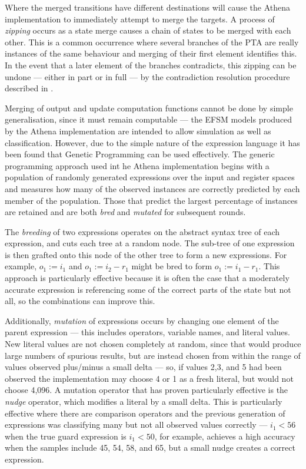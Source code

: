 Where the merged transitions have different destinations will cause the Athena implementation to immediately attempt to merge the targets. A process of \emph{zipping} occurs as a state merge causes a chain of states to be merged with each other. This is a common occurrence where several branches of the PTA are really instances of the same behaviour and merging of their first element identifies this. In the event that a later element of the branches contradicts, this zipping can be undone --- either in part or in full --- by the contradiction resolution procedure described in .

Merging of output and update computation functions cannot be done by simple generalisation, since it must remain computable --- the EFSM models produced by the Athena implementation are intended to allow simulation as well as classification. However, due to the simple nature of the expression language it has been found that Genetic Programming \cite{} can be used effectively. The generic programming approach used int he Athena implementation begins with a population of randomly generated expressions over the input and register spaces and measures how many of the observed instances are correctly predicted by each member of the population. Those that predict the largest percentage of instances are retained and are both \emph{bred} and \emph{mutated} for subsequent rounds. 

The \emph{breeding} of two expressions operates on the abstract syntax tree of each expression, and cuts each tree at a random node. The sub-tree of one expression is then grafted onto this node of the other tree to form a new expressions. For example, $o_1 := i_1$ and $o_1 := i_2 - r_1$ might be bred to form $o_1 := i_1 - r_1$. This approach is particularly effective because it is often the case that a moderately accurate expression is referencing some of the correct parts of the state but not all, so the combinations can improve this.

Additionally, \emph{mutation} of expressions occurs by changing one element of the parent expression --- this includes operators, variable names, and literal values. New literal values are not chosen completely at random, since that would produce large numbers of spurious results, but are instead chosen from within the range of values observed plus/minus a small delta --- so, if values 2,3, and 5 had been observed the implementation may choose 4 or 1 as a fresh literal, but would not choose 4,096. A mutation operator that has proven particularly effective is the \emph{nudge} operator, which modifies a literal by a small delta. This is particularly effective where there are comparison operators and the previous generation of expressions was classifying many but not all observed values correctly --- $i_1 < 56$ when the true guard expression is $i_1 < 50$, for example, achieves a high accuracy when the samples include 45, 54, 58, and 65, but a small nudge creates a correct expression.

